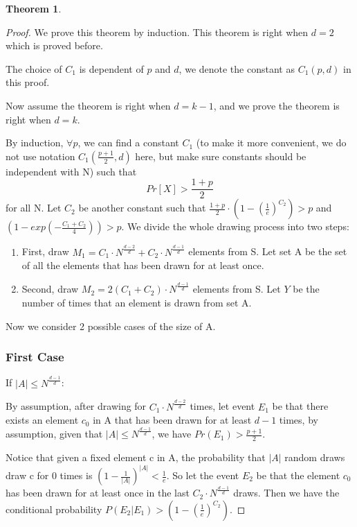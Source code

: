 \documentclass{article}
\newtheorem{theorem}{Theorem}
\begin{document}
\begin{spacing}{1.1}
\begin{theorem}
    \end{theorem}
    
    \begin{proof}
    
    We prove this theorem by induction. This theorem is right when $d=2$ which is proved before.
    
    The choice of $C_1$ is dependent of $p$ and $d$, we denote the constant as $C_1(p,d)$ in this proof.
    
    Now assume the theorem is right when $d=k-1$, and we prove the theorem is right when $d=k$.
    
    By induction, $\forall p$, we can find a constant $C_1$ (to make it more convenient, we do not use notation $C_1(\frac{p+1}{2}, d)$ here, but make sure constants should be independent with N) such that
    $$Pr[X] > \frac{1+p}{2}$$
    for all N. Let $C_2$ be another constant such that $\frac{1+p}{2} \cdot (1 - (\frac{1}{e})^{C_2}) > p$ and $(1 - exp(-\frac{C_1 + C_2}{4})) > p$. We divide the whole drawing process into two steps:
    \begin{enumerate}
        \item First, draw $M_1 = C_1 \cdot N^{\frac{d-2}{d}} + C_2 \cdot N^{\frac{d-1}{d}}$ elements from S. Let set A be the set of all the elements that has been drawn for at least once.
        \item Second, draw $M_2 = 2(C_1 + C_2)\cdot N^{\frac{d-1}{d}}$ elements from S. Let $Y$ be the number of times that an element is drawn from set A.
    \end{enumerate}
    Now we consider 2 possible cases of the size of A.
    
    \subsubsection{First Case}
    If $|A| \leq N^{\frac{d-1}{d}}$:

    By assumption, after drawing for $C_1 \cdot N^{\frac{d-2}{d}}$ times, let event $E_1$ be that there exists an element $c_0$ in A that has been drawn for at least $d-1$ times, by assumption, given that $|A| \leq N^{\frac{d-1}{d}}$, we have $Pr(E_1) > \frac{p+1}{2}$.

    Notice that given a fixed element c in A, the probability that $|A|$ random draws draw c for 0 times is $(1 - \frac{1}{|A|})^{|A|} < \frac{1}{e}$. So let the event $E_2$ be that the element $c_0$ has been drawn for at least once in the last $C_2 \cdot N^{\frac{d-1}{d}}$ draws. Then we have the conditional probability $P(E_2|E_1) > (1 - (\frac{1}{e})^{C_2})$.


\end{proof}
\end{spacing}
\end{document}
